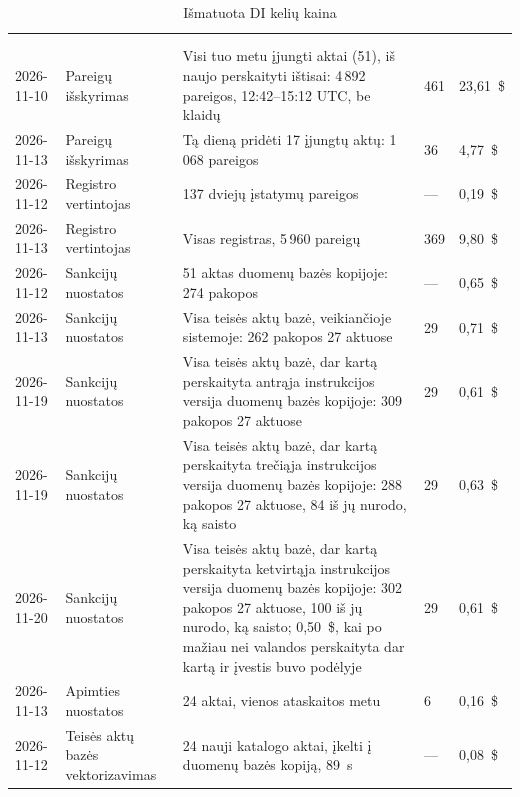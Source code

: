 \begin{xltabular}{\textwidth}{@{}L{17mm}L{35mm}YR{12mm}R{15mm}@{}}
\caption{Išmatuota DI kelių kaina}\label{tab:control:costs}\\
\toprule
{} &  &  &  &  \\
\midrule
\endfirsthead
\toprule
{} &  &  &  &  \\
\midrule
\endhead
\bottomrule
\endlastfoot
{} \\
2026-11-10 & Pareigų išskyrimas & Visi tuo metu įjungti aktai (51), iš naujo perskaityti ištisai: 4\,892 pareigos, 12:42--15:12 UTC, be klaidų & 461 & 23,61~\$ \\
2026-11-13 & Pareigų išskyrimas & Tą dieną pridėti 17 įjungtų aktų: 1\,068 pareigos & 36 & 4,77~\$ \\
2026-11-12 & Registro vertintojas & 137 dviejų įstatymų pareigos & --- & 0,19~\$ \\
2026-11-13 & Registro vertintojas & Visas registras, 5\,960 pareigų & 369 & 9,80~\$ \\
2026-11-12 & Sankcijų nuostatos & 51 aktas duomenų bazės kopijoje: 274 pakopos & --- & 0,65~\$ \\
2026-11-13 & Sankcijų nuostatos & Visa teisės aktų bazė, veikiančioje sistemoje: 262 pakopos 27 aktuose & 29 & 0,71~\$ \\
2026-11-19 & Sankcijų nuostatos & Visa teisės aktų bazė, dar kartą perskaityta antrąja instrukcijos versija duomenų bazės kopijoje: 309 pakopos 27 aktuose & 29 & 0,61~\$ \\
2026-11-19 & Sankcijų nuostatos & Visa teisės aktų bazė, dar kartą perskaityta trečiąja instrukcijos versija duomenų bazės kopijoje: 288 pakopos 27 aktuose, 84 iš jų nurodo, ką saisto & 29 & 0,63~\$ \\
2026-11-20 & Sankcijų nuostatos & Visa teisės aktų bazė, dar kartą perskaityta ketvirtąja instrukcijos versija duomenų bazės kopijoje: 302 pakopos 27 aktuose, 100 iš jų nurodo, ką saisto; 0,50~\$, kai po mažiau nei valandos perskaityta dar kartą ir įvestis buvo podėlyje & 29 & 0,61~\$ \\
2026-11-13 & Apimties nuostatos & 24 aktai, vienos ataskaitos metu & 6 & 0,16~\$ \\
2026-11-12 & Teisės aktų bazės vektorizavimas & 24 nauji katalogo aktai, įkelti į duomenų bazės kopiją, 89~s & --- & 0,08~\$ \\

\end{xltabular}
